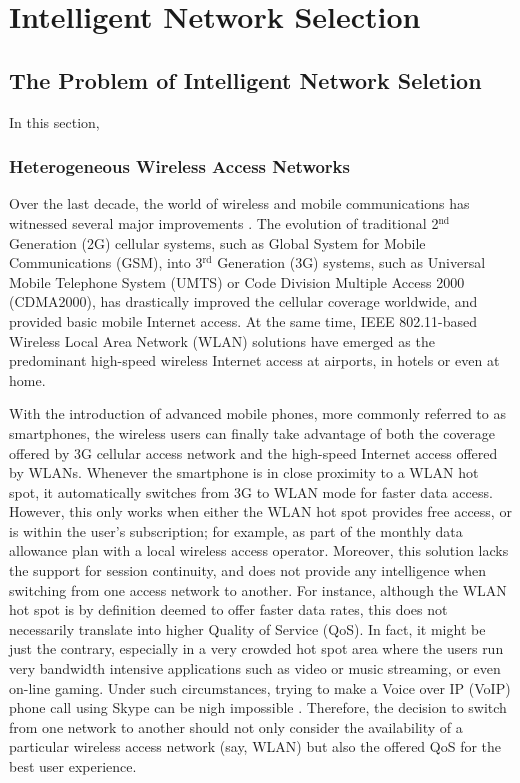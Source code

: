 \chapter{Intelligent Network Selection} %
\label{cha:intelligent}

\minitoc
\vspace{10mm}

\section{The Problem of Intelligent Network Seletion} %
\label{sec:the_problem_of_intelligent_network_seletion_intelligent}
In this section, 

\subsection{Heterogeneous Wireless Access Networks} %
\label{sub:heterogeneous_wireless_access_networks_intelligent}
Over the last decade, the world of wireless and mobile communications has witnessed several major improvements \cite{ABC03}. The evolution of traditional 2$^\text{nd}$ Generation (2G) cellular systems, such as Global System for Mobile Communications (GSM), into 3$^{\text{rd}}$ Generation (3G) systems, such as Universal Mobile Telephone System (UMTS) or Code Division Multiple Access 2000 (CDMA2000), has drastically improved the cellular coverage worldwide, and provided basic mobile Internet access. At the same time, IEEE 802.11-based Wireless Local Area Network (WLAN) solutions have emerged as the predominant high-speed wireless Internet access at airports, in hotels or even at home.

With the introduction of advanced mobile phones, more commonly referred to as smartphones, the wireless users can finally take advantage of both the coverage offered by 3G cellular access network and the high-speed Internet access offered by WLANs. Whenever the smartphone is in close proximity to a WLAN hot spot, it automatically switches from 3G to WLAN mode for faster data access. However, this only works when either the WLAN hot spot provides free access, or is within the user's subscription; for example, as part of the monthly data allowance plan with a local wireless access operator. Moreover, this solution lacks the support for session continuity, and does not provide any intelligence when switching from one access network to another. For instance, although the WLAN hot spot is by definition deemed to offer faster data rates, this does not necessarily translate into higher Quality of Service (QoS). In fact, it might be just the contrary, especially in a very crowded hot spot area where the users run very bandwidth intensive applications such as video or music streaming, or even on-line gaming. Under such circumstances, trying to make a Voice over IP (VoIP) phone call using Skype can be nigh impossible \cite{Wisely4gWLAN09}. Therefore, the decision to switch from one network to another should not only consider the availability of a particular wireless access network (say, WLAN) but also the offered QoS for the best user experience.

